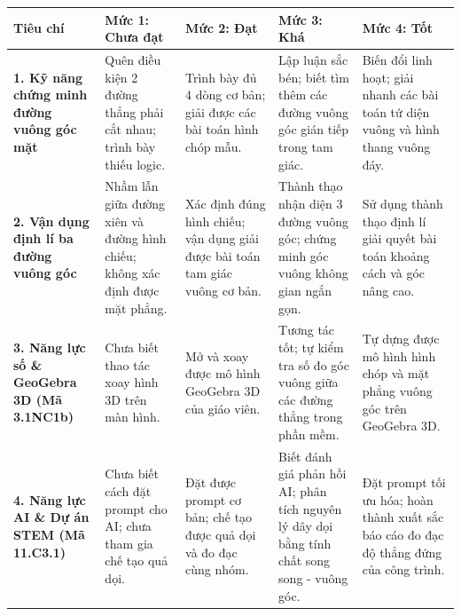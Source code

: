 \documentclass[12pt, a4paper]{article}
\begin{document}
\begin{center}
\begin{tabularx}{\textwidth}{|p{2.8cm}|X|X|X|X|}
    \hline
    \textbf{Tiêu chí} & \textbf{Mức 1: Chưa đạt} & \textbf{Mức 2: Đạt} & \textbf{Mức 3: Khá} & \textbf{Mức 4: Tốt} \\ \hline
    \textbf{1. Kỹ năng chứng minh đường vuông góc mặt} & Quên điều kiện 2 đường thẳng phải cắt nhau; trình bày thiếu logic. & Trình bày đủ 4 dòng cơ bản; giải được các bài toán hình chóp mẫu. & Lập luận sắc bén; biết tìm thêm các đường vuông góc gián tiếp trong tam giác. & Biến đổi linh hoạt; giải nhanh các bài toán tứ diện vuông và hình thang vuông đáy. \\ \hline
    \textbf{2. Vận dụng định lí ba đường vuông góc} & Nhầm lẫn giữa đường xiên và đường hình chiếu; không xác định được mặt phẳng. & Xác định đúng hình chiếu; vận dụng giải được bài toán tam giác vuông cơ bản. & Thành thạo nhận diện 3 đường vuông góc; chứng minh góc vuông không gian ngắn gọn. & Sử dụng thành thạo định lí giải quyết bài toán khoảng cách và góc nâng cao. \\ \hline
    \textbf{3. Năng lực số \& GeoGebra 3D (Mã 3.1NC1b)} & Chưa biết thao tác xoay hình 3D trên màn hình. & Mở và xoay được mô hình GeoGebra 3D của giáo viên. & Tương tác tốt; tự kiểm tra số đo góc vuông giữa các đường thẳng trong phần mềm. & Tự dựng được mô hình hình chóp và mặt phẳng vuông góc trên GeoGebra 3D. \\ \hline
    \textbf{4. Năng lực AI \& Dự án STEM (Mã 11.C3.1)} & Chưa biết cách đặt prompt cho AI; chưa tham gia chế tạo quả dọi. & Đặt được prompt cơ bản; chế tạo được quả dọi và đo đạc cùng nhóm. & Biết đánh giá phản hồi AI; phân tích nguyên lý dây dọi bằng tính chất song song - vuông góc. & Đặt prompt tối ưu hóa; hoàn thành xuất sắc báo cáo đo đạc độ thẳng đứng của công trình. \\ \hline
\end{tabularx}
\end{center}
\end{document}

